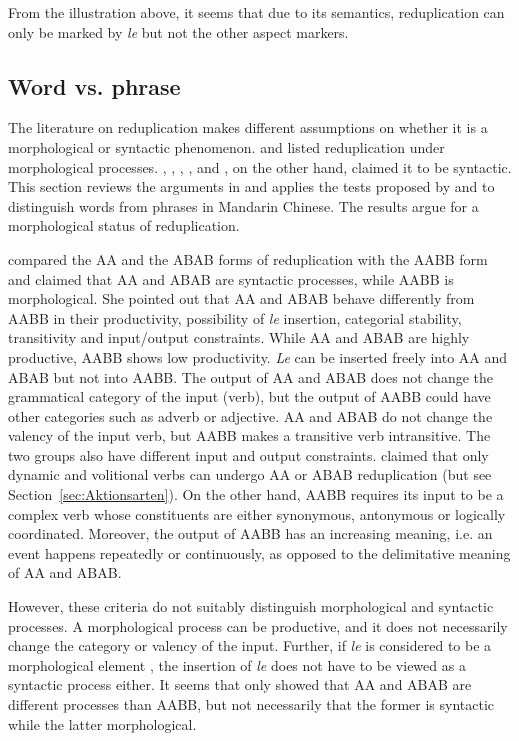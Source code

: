 \documentclass[11pt,a4paper,fleqn,draft]{article}
\begin{document}
From the illustration above, it seems that due to its semantics, reduplication can only be marked by \emph{le} but not the other aspect markers.







\subsection{Word vs. phrase}\label{sec:word}

The literature on reduplication makes different assumptions on whether it is a morphological or syntactic phenomenon.
\citet{Chao1968} and \citet{LiThompson1981} listed reduplication under morphological processes. 
\citet{Arcodiaetal2014}, \citet{BascianoMelloni2017}, \citet{MelloniBasciano2018}, \citet{Xie2020}, \citet{Xiong2016} and \citet{YangWei2017}, on the other hand, claimed it to be syntactic.
This section reviews the arguments in \citet{Xie2020} and applies the tests proposed by \citet{Duanmu1998} and \citet{Schaefer2009} to distinguish words from phrases in Mandarin Chinese. 
The results argue for a morphological status of reduplication.


\citet{Xie2020} compared the AA and the ABAB forms of reduplication with the AABB form and claimed that AA and ABAB are syntactic processes, while AABB is morphological.
She pointed out that AA and ABAB behave differently from AABB in their productivity, possibility of \emph{le} insertion, categorial stability, transitivity and input/output constraints.
While AA and ABAB are highly productive, AABB shows low productivity. 
\emph{Le} can be inserted freely into AA and ABAB but not into AABB.
The output of AA and ABAB does not change the grammatical category of the input (verb), but the output of AABB could have other categories such as adverb or adjective.
AA and ABAB do not change the valency of the input verb, but AABB makes a transitive verb intransitive. 
The two groups also have different input and output constraints. 
\citet{Xie2020} claimed that only dynamic and volitional verbs can undergo AA or ABAB reduplication (but see Section~\ref{sec:Aktionsarten}).
On the other hand, AABB requires its input to be a complex verb whose constituents are either synonymous, antonymous or logically coordinated. 
Moreover, the output of AABB has an increasing meaning, i.e. an event happens repeatedly or continuously, as opposed to the delimitative meaning of AA and ABAB.

However, these criteria do not suitably distinguish morphological and syntactic processes. 
A morphological process can be productive, and it does not necessarily change the category or valency of the input.
Further, if \emph{le} is considered to be a morphological element \citep[e.g.][]{Huangetal2009, MuellerLipenkova2013}, the insertion of \emph{le} does not have to be viewed as a syntactic
process either.
It seems that \citet{Xie2020} only showed that AA and ABAB are different processes than AABB, but not necessarily that the former is syntactic while the latter morphological.
\end{document}
